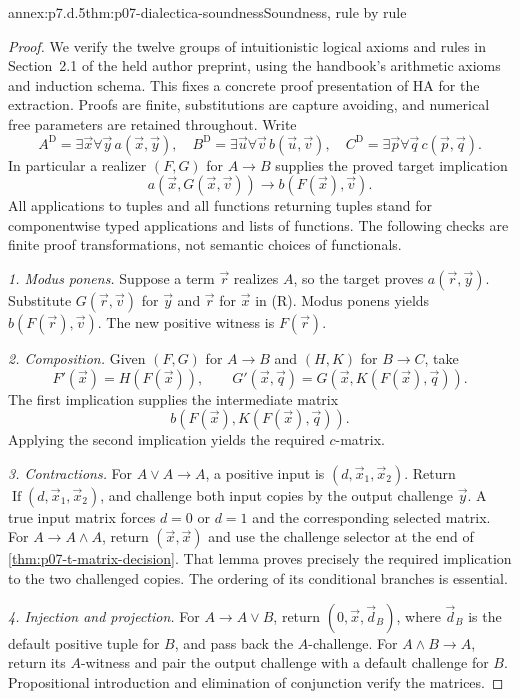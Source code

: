 \begin{annexitem}{annex:p7.d.5}{thm:p07-dialectica-soundness}{Soundness, rule by rule}
\begin{proof}
We verify the twelve groups of intuitionistic logical axioms and rules
in Section~2.1 of the held author preprint, using the handbook's
arithmetic axioms and induction schema. This fixes a concrete proof
presentation of HA for the extraction. Proofs are finite, substitutions
are capture avoiding, and numerical free parameters are retained
throughout. Write
\[
 A^{\mathrm D}=\exists\vec x\forall\vec y\,a(\vec x,\vec y),
 \quad B^{\mathrm D}=\exists\vec u\forall\vec v\,b(\vec u,\vec v),
 \quad C^{\mathrm D}=\exists\vec p\forall\vec q\,c(\vec p,\vec q).
\]
In particular a realizer \((F,G)\) for \(A\to B\) supplies the
proved target implication
\[
 a(\vec x,G(\vec x,\vec v))\longrightarrow
 b(F(\vec x),\vec v).
 \tag{R}
\]
All applications to tuples and all functions returning tuples stand for
componentwise typed applications and lists of functions. The following
checks are finite proof transformations, not semantic choices of
functionals.

\emph{1. Modus ponens.} Suppose a term \(\vec r\) realizes \(A\),
so the target proves \(a(\vec r,\vec y)\). Substitute
\(G(\vec r,\vec v)\) for \(\vec y\) and \(\vec r\) for
\(\vec x\) in (R). Modus ponens yields
\(b(F(\vec r),\vec v)\). The new positive witness is \(F(\vec r)\).

\emph{2. Composition.} Given \((F,G)\) for \(A\to B\) and
\((H,K)\) for \(B\to C\), take
\[
 F'(\vec x)=H(F(\vec x)),\qquad
 G'(\vec x,\vec q)=G(\vec x,K(F(\vec x),\vec q)).
\]
The first implication supplies the intermediate matrix
\[
 b(F(\vec x),K(F(\vec x),\vec q)).
\]
Applying the second implication yields the required \(c\)-matrix.

\emph{3. Contractions.} For \(A\lor A\to A\), a positive input is
\((d,\vec x_1,\vec x_2)\). Return
\(\operatorname{If}(d,\vec x_1,\vec x_2)\), and challenge both
input copies by the output challenge \(\vec y\). A true input
matrix forces \(d=0\) or \(d=1\) and the corresponding selected
matrix. For \(A\to A\land A\), return \((\vec x,\vec x)\)
and use the challenge selector at the end of
\cref{thm:p07-t-matrix-decision}. That lemma proves precisely the
required implication to the two challenged copies. The ordering of its
conditional branches is essential.

\emph{4. Injection and projection.} For \(A\to A\lor B\), return
\((0,\vec x,\vec d_B)\), where \(\vec d_B\) is the default
positive tuple for \(B\), and pass back the \(A\)-challenge.
For \(A\land B\to A\), return its \(A\)-witness and pair the
output challenge with a default challenge for \(B\). Propositional
introduction and elimination of conjunction verify the matrices.


\end{proof}
\end{annexitem}

